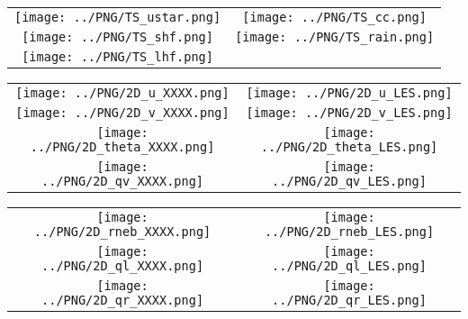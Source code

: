 \documentclass{article}
\begin{document}

\begin{table}
  \begin{tabular}{cc}
    \texttt{[image: ../PNG/TS\_ustar.png]} & \texttt{[image: ../PNG/TS\_cc.png]}   \\ 
    \texttt{[image: ../PNG/TS\_shf.png]}   & \texttt{[image: ../PNG/TS\_rain.png]}  \\
    \texttt{[image: ../PNG/TS\_lhf.png]}   & 
  \end{tabular}
\end{table}

\newpage



\begin{table}
  \begin{tabular}{cc}
     \texttt{[image: ../PNG/2D\_u\_XXXX.png]}     & \texttt{[image: ../PNG/2D\_u\_LES.png]}     \\
     \texttt{[image: ../PNG/2D\_v\_XXXX.png]}     & \texttt{[image: ../PNG/2D\_v\_LES.png]}     \\
     \texttt{[image: ../PNG/2D\_theta\_XXXX.png]} & \texttt{[image: ../PNG/2D\_theta\_LES.png]} \\
     \texttt{[image: ../PNG/2D\_qv\_XXXX.png]}    & \texttt{[image: ../PNG/2D\_qv\_LES.png]}
  \end{tabular}
\end{table}

\newpage

\begin{table}
  \begin{tabular}{cc}
     \texttt{[image: ../PNG/2D\_rneb\_XXXX.png]} & \texttt{[image: ../PNG/2D\_rneb\_LES.png]} \\
     \texttt{[image: ../PNG/2D\_ql\_XXXX.png]}   & \texttt{[image: ../PNG/2D\_ql\_LES.png]}   \\
     \texttt{[image: ../PNG/2D\_qr\_XXXX.png]}   & \texttt{[image: ../PNG/2D\_qr\_LES.png]}
  \end{tabular}
\end{table}
\end{document}

